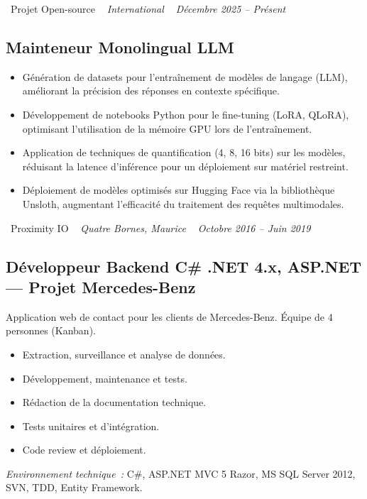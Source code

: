 \documentclass[10pt,a4paper]{article}
\begin{document}
\vspace{10pt}

\noindent\textcolor{primary}{ \faBuilding\ Projet Open-source} \quad
\textit{ \small \textcolor{darkgray}{ \faMapMarker\ } International } \hfill
\textit{ \small \textcolor{darkgray}{ \faCalendar\ } Décembre 2025 -- Présent }

\vspace{4pt}

\subsection*{Mainteneur Monolingual LLM}
\color{darkgray}
\begin{itemize}
  \item Génération de datasets pour l'entraînement de modèles de langage (LLM), améliorant la précision des réponses en contexte spécifique.
  \item Développement de notebooks Python pour le fine-tuning (LoRA, QLoRA), optimisant l'utilisation de la mémoire GPU lors de l'entraînement.
  \item Application de techniques de quantification (4, 8, 16 bits) sur les modèles, réduisant la latence d'inférence pour un déploiement sur matériel restreint.
  \item Déploiement de modèles optimisés sur Hugging Face via la bibliothèque Unsloth, augmentant l'efficacité du traitement des requêtes multimodales.
\end{itemize}

\vspace{10pt}

\noindent\textcolor{primary}{ \faBuilding\ Proximity IO} \quad
\textit{ \small \textcolor{darkgray}{ \faMapMarker\ } Quatre Bornes, Maurice } \hfill
\textit{ \small \textcolor{darkgray}{ \faCalendar\ } Octobre 2016 -- Juin 2019 }

\vspace{4pt}

\subsection*{Développeur Backend C\# .NET 4.x, ASP.NET --- Projet Mercedes-Benz}
\color{darkgray}
Application web de contact pour les clients de Mercedes-Benz. Équipe de 4 personnes (Kanban).
\begin{itemize}
  \item Extraction, surveillance et analyse de données.
  \item Développement, maintenance et tests.
  \item Rédaction de la documentation technique.
  \item Tests unitaires et d'intégration.
  \item Code review et déploiement.
\end{itemize}
\textit{Environnement technique~:} C\#, ASP.NET MVC 5 Razor, MS SQL Server 2012, SVN, TDD, Entity Framework.
\end{document}

